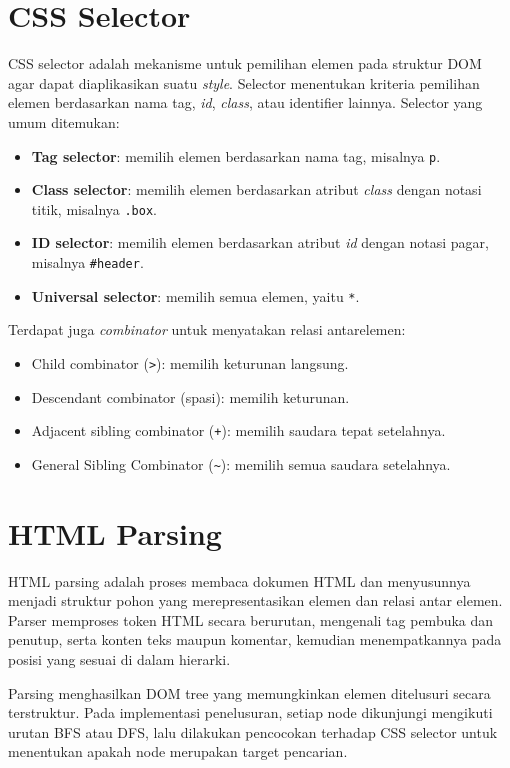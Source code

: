 \section{CSS Selector}

CSS selector adalah mekanisme untuk pemilihan elemen pada struktur DOM agar dapat diaplikasikan suatu \textit{style}. 
Selector menentukan kriteria pemilihan elemen berdasarkan nama tag, \textit{id}, \textit{class}, atau identifier lainnya. Selector yang umum ditemukan:
\begin{itemize}
    \item \textbf{Tag selector}: memilih elemen berdasarkan nama tag, misalnya \texttt{p}.
    \item \textbf{Class selector}: memilih elemen berdasarkan atribut \textit{class} dengan notasi titik, misalnya \texttt{.box}.
    \item \textbf{ID selector}: memilih elemen berdasarkan atribut \textit{id} dengan notasi pagar, misalnya \texttt{\#header}.
    \item \textbf{Universal selector}: memilih semua elemen, yaitu \texttt{*}.
\end{itemize}

Terdapat juga \textit{combinator} untuk menyatakan relasi antarelemen:
\begin{itemize}
    \item Child combinator (\texttt{>}): memilih keturunan langsung.
    \item Descendant combinator (spasi): memilih keturunan.
    \item Adjacent sibling combinator (\texttt{+}): memilih saudara tepat setelahnya.
    \item General Sibling Combinator (\texttt{\textasciitilde}): memilih semua saudara setelahnya.
\end{itemize}

\section{HTML Parsing}

HTML parsing adalah proses membaca dokumen HTML dan menyusunnya menjadi struktur pohon yang merepresentasikan elemen dan relasi antar elemen. 
Parser memproses token HTML secara berurutan, mengenali tag pembuka dan penutup, serta konten teks maupun komentar, kemudian menempatkannya pada posisi yang sesuai di dalam hierarki.

Parsing menghasilkan DOM tree yang memungkinkan elemen ditelusuri secara terstruktur. 
Pada implementasi penelusuran, setiap node dikunjungi mengikuti urutan BFS atau DFS, lalu dilakukan pencocokan terhadap CSS selector untuk menentukan apakah node merupakan target pencarian.